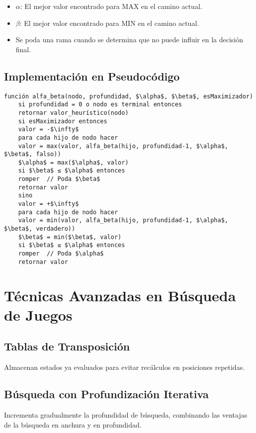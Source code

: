 \documentclass[12pt,a4paper]{report}
\begin{document}
	\begin{itemize}
		\item \textbf{$\alpha$}: El mejor valor encontrado para MAX en el camino actual.
		\item \textbf{$\beta$}: El mejor valor encontrado para MIN en el camino actual.
		\item Se poda una rama cuando se determina que no puede influir en la decisión final.
	\end{itemize}
	
	\subsection{Implementación en Pseudocódigo}
	
\begin{lstlisting}[mathescape=true]
    función alfa_beta(nodo, profundidad, $\alpha$, $\beta$, esMaximizador)
    si profundidad = 0 o nodo es terminal entonces
    retornar valor_heurístico(nodo)
    si esMaximizador entonces
    valor = -$\infty$
    para cada hijo de nodo hacer
    valor = max(valor, alfa_beta(hijo, profundidad-1, $\alpha$, $\beta$, falso))
    $\alpha$ = max($\alpha$, valor)
    si $\beta$ ≤ $\alpha$ entonces
    romper  // Poda $\beta$
    retornar valor
    sino
    valor = +$\infty$
    para cada hijo de nodo hacer
    valor = min(valor, alfa_beta(hijo, profundidad-1, $\alpha$, $\beta$, verdadero))
    $\beta$ = min($\beta$, valor)
    si $\beta$ ≤ $\alpha$ entonces
    romper  // Poda $\alpha$
    retornar valor
\end{lstlisting}
	
	\section{Técnicas Avanzadas en Búsqueda de Juegos}
	
	\subsection{Tablas de Transposición}
	
	Almacenan estados ya evaluados para evitar recálculos en posiciones repetidas.
	
	\subsection{Búsqueda con Profundización Iterativa}
	
	Incrementa gradualmente la profundidad de búsqueda, combinando las ventajas de la búsqueda en anchura y en profundidad.
	
\end{document}
